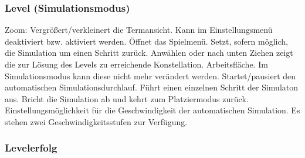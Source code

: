\subsubsection{Level (Simulationsmodus)}

\begin{center}
\setlength\fboxsep{20pt}
\setlength\fboxrule{1pt}
\end{center}

\begin{requirements}
 Zoom: Vergrößert/verkleinert die Termansicht. Kann im Einstellungsmenü deaktiviert bzw. aktiviert werden.
 Öffnet das Spielmenü.
 Setzt, sofern möglich, die Simulation um einen Schritt zurück.
 Anwählen oder nach unten Ziehen zeigt die zur Lösung des Levels zu erreichende Konstellation.
 Arbeitsfläche. Im Simulationsmodus kann diese nicht mehr verändert werden.
 Startet/pausiert den automatischen Simulationsdurchlauf.
 Führt einen einzelnen Schritt der Simulaton aus.
 Bricht die Simulation ab und kehrt zum Platziermodus zurück.
 Einstellungsmöglichkeit für die Geschwindigkeit der automatischen Simulation. Es stehen zwei Geschwindigkeitsstufen zur Verfügung.
\end{requirements}

\subsubsection{Levelerfolg}

